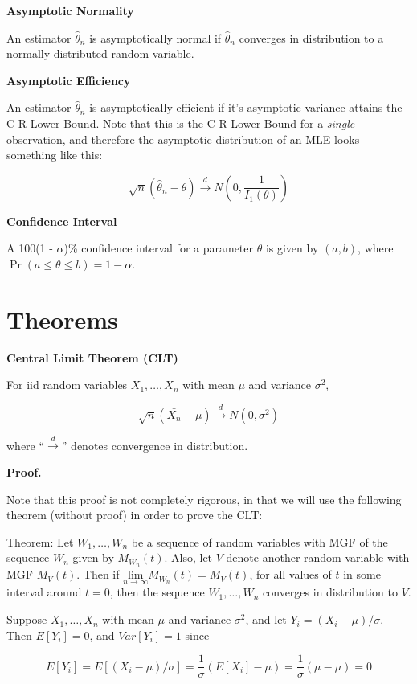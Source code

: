 \documentclass[
  letterpaper,
  DIV=11,
  numbers=noendperiod]{scrreprt}
\begin{document}
\textbf{Asymptotic Normality}

An estimator \(\hat{\theta}_n\) is asymptotically normal if
\(\hat{\theta}_n\) converges in distribution to a normally distributed
random variable.

\textbf{Asymptotic Efficiency}

An estimator \(\hat{\theta}_n\) is asymptotically efficient if it's
asymptotic variance attains the C-R Lower Bound. Note that this is the
C-R Lower Bound for a \emph{single} observation, and therefore the
asymptotic distribution of an MLE looks something like this:

\[
\sqrt{n} (\hat{\theta}_n - \theta) \overset{d}{\to} N\left( 0, \frac{1}{I_1(\theta)}\right)
\]

\textbf{Confidence Interval}

A 100(1 - \(\alpha\))\% confidence interval for a parameter \(\theta\)
is given by \((a, b)\), where
\(\Pr(a \leq \theta \leq b) = 1 - \alpha\).

\section{Theorems}\label{theorems-5}

\textbf{Central Limit Theorem (CLT)}

For iid random variables \(X_1, \dots, X_n\) with mean \(\mu\) and
variance \(\sigma^2\),

\[
\sqrt{n} (\bar{X_n} - \mu) \overset{d}{\to} N(0, \sigma^2)
\]

where ``\(\overset{d}{\to}\)'' denotes convergence in distribution.

\textbf{Proof.}

Note that this proof is not completely rigorous, in that we will use the
following theorem (without proof) in order to prove the CLT:

Theorem: Let \(W_1, \dots, W_n\) be a sequence of random variables with
MGF of the sequence \(W_n\) given by \(M_{W_n}(t)\). Also, let \(V\)
denote another random variable with MGF \(M_V(t)\). Then if
\(\underset{n \to \infty}{\text{lim}} M_{W_n}(t) = M_V(t)\), for all
values of \(t\) in some interval around \(t = 0\), then the sequence
\(W_1, \dots, W_n\) converges in distribution to \(V\).

Suppose \(X_1, \dots, X_n\) with mean \(\mu\) and variance \(\sigma^2\),
and let \(Y_i = (X_i - \mu)/\sigma\). Then \(E[Y_i] = 0\), and
\(Var[Y_i] = 1\) since

\[
E[Y_i] = E \left[ (X_i - \mu)/\sigma\right] = \frac{1}{\sigma} (E[X_i] - \mu) = \frac{1}{\sigma} (\mu - \mu) = 0
\]
\end{document}
